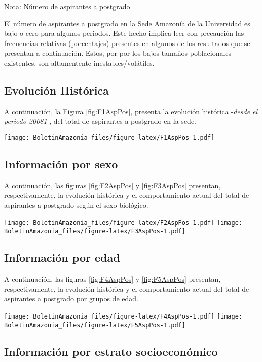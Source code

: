 \documentclass[
]{book}
\begin{document}
Nota: Número de aspirantes a postgrado

El número de aspirantes a postgrado en la Sede Amazonía de la Universidad es bajo o cero para algunos periodos. Este hecho implica leer con precaución las frecuencias relativas (porcentajes) presentes en algunos de los resultados que se presentan a continuación. Estos, por por los bajos tamaños poblacionales existentes, son altamentente inestables/volátiles.

\hypertarget{evoluciuxf3n-histuxf3rica-2}{%
\subsection{Evolución Histórica}\label{evoluciuxf3n-histuxf3rica-2}}

A continuación, la Figura \ref{fig:F1AspPos}, presenta la evolución histórica -\emph{desde el periodo 20081}-, del total de aspirantes a postgrado en la sede.

\texttt{[image: BoletinAmazonia\_files/figure-latex/F1AspPos-1.pdf]}

\hypertarget{informaciuxf3n-por-sexo-2}{%
\subsection{Información por sexo}\label{informaciuxf3n-por-sexo-2}}

A continuación, las figuras \ref{fig:F2AspPos} y \ref{fig:F3AspPos} presentan, respectivamente, la evolución histórica y el comportamiento actual del total de aspirantes a postgrado según el sexo biológico.

\texttt{[image: BoletinAmazonia\_files/figure-latex/F2AspPos-1.pdf]}
\texttt{[image: BoletinAmazonia\_files/figure-latex/F3AspPos-1.pdf]}

\hypertarget{informaciuxf3n-por-edad-2}{%
\subsection{Información por edad}\label{informaciuxf3n-por-edad-2}}

A continuación, las figuras \ref{fig:F4AspPos} y \ref{fig:F5AspPos} presentan, respectivamente, la evolución histórica y el comportamiento actual del total de aspirantes a postgrado por grupos de edad.

\texttt{[image: BoletinAmazonia\_files/figure-latex/F4AspPos-1.pdf]}
\texttt{[image: BoletinAmazonia\_files/figure-latex/F5AspPos-1.pdf]}

\hypertarget{informaciuxf3n-por-estrato-socioeconuxf3mico-2}{%
\subsection{Información por estrato socioeconómico}\label{informaciuxf3n-por-estrato-socioeconuxf3mico-2}}
\end{document}
